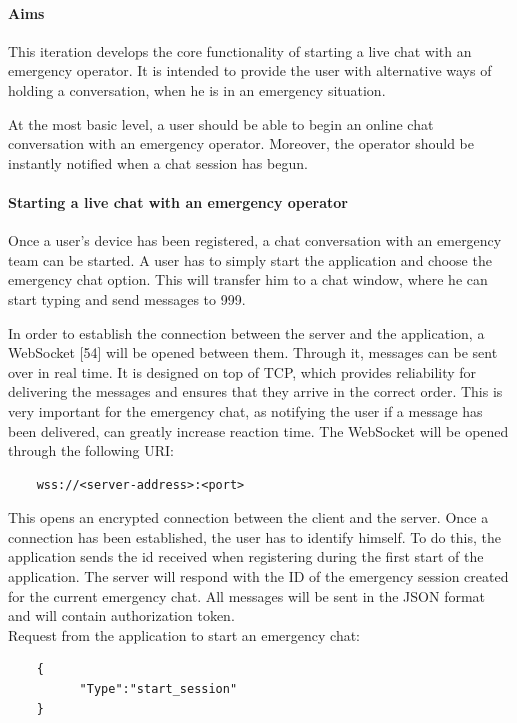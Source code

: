 \documentclass{article}
\begin{document}
			\paragraph{Aims}
			This iteration develops the core functionality of starting a live chat with an emergency operator. It is intended to provide the user with alternative ways of holding a conversation, when he is in an emergency situation.

At the most basic level, a user should be able to begin an online chat conversation with an emergency operator. Moreover, the operator should be instantly notified when a chat session has begun. 

		\paragraph{Starting a live chat with an emergency operator}
		Once a user’s device has been registered, a chat conversation with an emergency team can be started. A user has to simply start the application and choose the emergency chat option. This will transfer him to a chat window, where he can start typing and send messages to 999. 

In order to establish the connection between the server and the application, a WebSocket [54] will be opened between them. Through it, messages can be sent over in real time. It is designed on top of TCP, which provides reliability for delivering the messages and ensures that they arrive in the correct order. This is very important for the emergency chat, as notifying the user if a message has been delivered, can greatly increase reaction time. The WebSocket will be opened through the following URI:
\begin{lstlisting}
	wss://<server-address>:<port>
\end{lstlisting}
This opens an encrypted connection between the client and the server. Once a connection has been established, the user has to identify himself. To do this, the application sends the id received when registering during the first start of the application. The server will respond with the ID of the emergency session created for the current emergency chat. All messages will be sent in the JSON format and will contain authorization token.\\

Request from the application to start an emergency chat:
\begin{lstlisting}
	{
          "Type":"start_session"
	}
\end{lstlisting}
\end{document}
